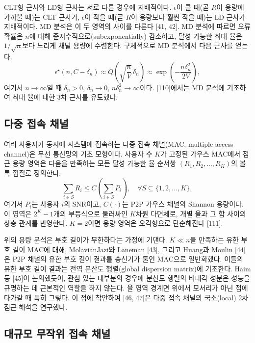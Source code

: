 CLT형 근사와 LD형 근사는 서로 다른 경우에 지배적이다. $\epsilon$이 클 때(곧 $R$이 용량에 가까울 때)는 CLT 근사가, $\epsilon$이 작을 때(곧 $R$이 용량보다 훨씬 작을 때)는 LD 근사가 지배적이다. MD 분석은 이 두 영역의 사이를 다룬다 [41, 42]. MD 분석에 따르면 오류 확률은 $n$에 대해 준지수적으로(subexponentially) 감소하고, 달성 가능한 최대 율은 $1/\sqrt{n}$보다 느리게 채널 용량에 수렴한다. 구체적으로 MD 분석에서 다음 근사를 얻는다.
\begin{equation}
\epsilon^\star(n,C-\delta_n)\approx Q\!\left(\sqrt{\frac{n}{V}}\,\delta_n\right)\approx\exp\!\left(-\frac{n\delta_n^2}{2V}\right), \tag{32}
\end{equation}
여기서 $n\to\infty$일 때 $\delta_n>0$, $\delta_n\to0$, $n\delta_n^2\to\infty$이다. [110]에서는 MD 분석에 기초하여 최대 율에 대한 3차 근사를 유도했다.

\subsection{다중 접속 채널}

여러 사용자가 동시에 시스템에 접속하는 다중 접속 채널(MAC, multiple access channel)은 무선 통신망의 기초 모형이다. 사용자 수 $K$가 고정된 가우스 MAC에서 점근 용량 영역은 다음을 만족하는 모든 달성 가능한 율 순서쌍 $(R_1,R_2,\dots,R_K)$의 볼록 껍질로 정의한다.
\begin{equation}
\sum_{i\in S}R_i\le C\!\left(\sum_{i\in S}P_i\right),\quad\forall S\subseteq\{1,2,\dots,K\}, \tag{33}
\end{equation}
여기서 $P_i$는 사용자 $i$의 SNR이고, $C(\cdot)$는 P2P 가우스 채널의 Shannon 용량이다. 이 영역은 $2^K-1$개의 부등식으로 둘러싸인 $K$차원 다면체로, 개별 율과 그 합 사이의 상충 관계를 반영한다. $K=2$이면 용량 영역은 오각형으로 단순해진다 [111].

위의 용량 분석은 부호 길이가 무한하다는 가정에 기댄다. $K\ll n$을 만족하는 유한 부호 길이 MAC에 대해, MolavianJazi와 Laneman [43], 그리고 Huang과 Moulin [44]은 P2P 채널의 유한 부호 길이 결과를 송신기가 둘인 MAC으로 일반화했다. 이들의 유한 부호 길이 결과는 전역 분산도 행렬(global dispersion matrix)에 기초한다. Haim 등 [45]이 논의했듯이, 관심 있는 대부분의 경우에 분산도 행렬의 비대각 성분은 성능을 규명하는 데 근본적인 역할을 하지 않는다. 율 영역 경계면 위에서 모서리가 아닌 점에 다가갈 때 특히 그렇다. 이 점에 착안하여 [46, 47]은 다중 접속 채널의 국소(local) 2차 점근 해석을 연구했다.

\subsection{대규모 무작위 접속 채널}

